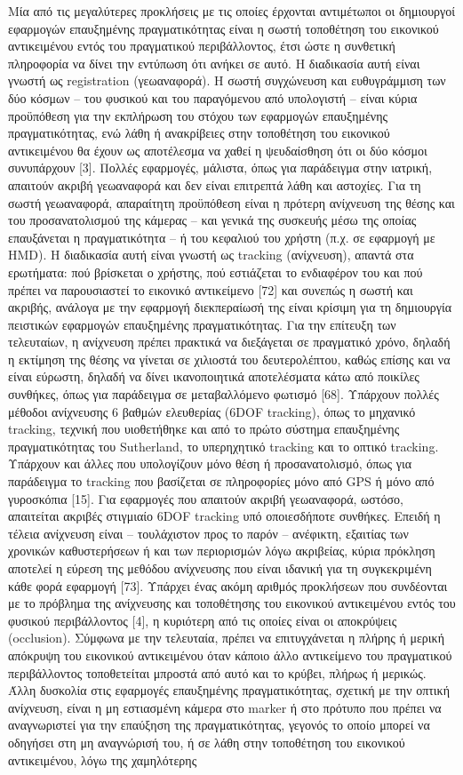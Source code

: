 Μία από τις μεγαλύτερες προκλήσεις με τις οποίες έρχονται αντιμέτωποι οι δημιουργοί εφαρμογών επαυξημένης πραγματικότητας είναι η σωστή τοποθέτηση του εικονικού αντικειμένου εντός του πραγματικού περιβάλλοντος, έτσι ώστε η συνθετική πληροφορία να δίνει την εντύπωση ότι ανήκει σε αυτό. Η διαδικασία αυτή είναι γνωστή ως registration (γεωαναφορά). Η σωστή συγχώνευση και ευθυγράμμιση των δύο κόσμων – του φυσικού και του παραγόμενου από υπολογιστή – είναι κύρια προϋπόθεση για την εκπλήρωση του στόχου των εφαρμογών επαυξημένης πραγματικότητας, ενώ λάθη ή ανακρίβειες στην τοποθέτηση του εικονικού αντικειμένου θα έχουν ως αποτέλεσμα να χαθεί η ψευδαίσθηση ότι οι δύο κόσμοι συνυπάρχουν [3]. Πολλές εφαρμογές, μάλιστα, όπως για παράδειγμα στην ιατρική, απαιτούν ακριβή γεωαναφορά και δεν είναι επιτρεπτά λάθη και αστοχίες. Για τη σωστή γεωαναφορά, απαραίτητη προϋπόθεση είναι η πρότερη ανίχνευση της θέσης και του προσανατολισμού της κάμερας – και γενικά της συσκευής μέσω της οποίας επαυξάνεται η πραγματικότητα – ή του κεφαλιού του χρήστη (π.χ. σε εφαρμογή με HMD). Η διαδικασία αυτή είναι γνωστή ως tracking (ανίχνευση), απαντά στα ερωτήματα: πού βρίσκεται ο χρήστης, πού εστιάζεται το ενδιαφέρον του και πού πρέπει να παρουσιαστεί το εικονικό αντικείμενο [72] και συνεπώς η σωστή και ακριβής, ανάλογα με την εφαρμογή διεκπεραίωσή της είναι κρίσιμη για τη δημιουργία πειστικών εφαρμογών επαυξημένης πραγματικότητας. Για την επίτευξη των τελευταίων, η ανίχνευση πρέπει πρακτικά να διεξάγεται σε πραγματικό χρόνο, δηλαδή η εκτίμηση της θέσης να γίνεται σε χιλιοστά του δευτερολέπτου, καθώς επίσης και να είναι εύρωστη, δηλαδή να δίνει ικανοποιητικά αποτελέσματα κάτω από ποικίλες συνθήκες, όπως για παράδειγμα σε μεταβαλλόμενο φωτισμό [68]. Υπάρχουν πολλές μέθοδοι ανίχνευσης 6 βαθμών ελευθερίας (6DOF tracking), όπως το μηχανικό tracking, τεχνική που υιοθετήθηκε και από το πρώτο σύστημα επαυξημένης πραγματικότητας του Sutherland, το υπερηχητικό tracking και το οπτικό tracking. Υπάρχουν και άλλες που υπολογίζουν μόνο θέση ή προσανατολισμό, όπως για παράδειγμα το tracking που βασίζεται σε πληροφορίες μόνο από GPS ή μόνο από γυροσκόπια [15]. Για εφαρμογές που απαιτούν ακριβή γεωαναφορά, ωστόσο, απαιτείται ακριβές στιγμιαίο 6DOF tracking υπό οποιεσδήποτε συνθήκες. Επειδή η τέλεια ανίχνευση είναι – τουλάχιστον προς το παρόν – ανέφικτη, εξαιτίας των χρονικών καθυστερήσεων ή και των περιορισμών λόγω ακριβείας, κύρια πρόκληση αποτελεί η εύρεση της μεθόδου ανίχνευσης που είναι ιδανική για τη συγκεκριμένη κάθε φορά εφαρμογή [73]. Υπάρχει ένας ακόμη αριθμός προκλήσεων που συνδέονται με το πρόβλημα της ανίχνευσης και τοποθέτησης του εικονικού αντικειμένου εντός του φυσικού περιβάλλοντος [4], η κυριότερη από τις οποίες είναι οι αποκρύψεις (occlusion). Σύμφωνα με την τελευταία, πρέπει να επιτυγχάνεται η πλήρης ή μερική απόκρυψη του εικονικού αντικειμένου όταν κάποιο άλλο αντικείμενο του πραγματικού περιβάλλοντος τοποθετείται μπροστά από αυτό και το κρύβει, πλήρως ή μερικώς. Άλλη δυσκολία στις εφαρμογές επαυξημένης πραγματικότητας, σχετική με την οπτική ανίχνευση, είναι η μη εστιασμένη κάμερα στο marker ή στο πρότυπο που πρέπει να αναγνωριστεί για την επαύξηση της πραγματικότητας, γεγονός το οποίο μπορεί να οδηγήσει στη μη αναγνώρισή του, ή σε λάθη στην τοποθέτηση του εικονικού αντικειμένου, λόγω της χαμηλότερης 